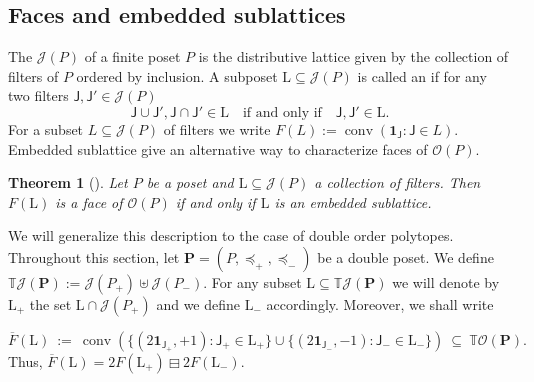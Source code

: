 \documentclass[11pt]{amsart}
\newtheorem{thm}{Theorem}[section]
\theoremstyle{definition}
\begin{document}
\subsection{Faces and embedded sublattices}\label{ssec:TO_faces}The {\textbf{\color{black}{Birkhoff lattice}}} ${{\mathcal{J}}({P})}$ of a finite poset ${P}$ is the
distributive lattice given by the collection of filters of ${P}$  ordered by
inclusion. A subposet ${\mathrm{L}} \subseteq {{\mathcal{J}}({P})}$ is called an {\textbf{\color{black}{embedded
sublattice}}} if for any two filters ${\mathsf{J}},{\mathsf{J}}' \in {{\mathcal{J}}({P})}$
\[
    {\mathsf{J}} \cup {\mathsf{J}}', {\mathsf{J}} \cap {\mathsf{J}}' \in {\mathrm{L}} \quad \text{if and
    only if} \quad {\mathsf{J}}, {\mathsf{J}}' \in {\mathrm{L}}.
\]
For a subset $L \subseteq {{\mathcal{J}}({P})}$ of filters we write $F(L) :=
\operatorname{conv}({\mathbf{1}}_{\mathsf{J}} : {\mathsf{J}} \in L)$. Embedded sublattice give an alternative
way to characterize faces of ${\mathcal{O}({P})}$.

\begin{thm}[{\cite[Thm~1.1(f)]{Wagner}}] \label{thm:O_faces}
    Let ${P}$ be a poset and ${\mathrm{L}} \subseteq {{\mathcal{J}}({P})}$ a collection of filters.
    Then $F({\mathrm{L}})$ is a face of ${\mathcal{O}({P})}$ if and only if ${\mathrm{L}}$ is an embedded
    sublattice.
\end{thm}

We will generalize this description to the case of double order polytopes.
Throughout this section, let ${\mathbf{P}} = ({P},\preceq_+,\preceq_-)$ be a double
poset. We define ${{\mathbb{T}}{{\mathcal{J}}({{\mathbf{P}}})}} := {{\mathcal{J}}({{P}_+})} \uplus {{\mathcal{J}}({{P}_-})}$. For any
subset ${\mathrm{L}} \subseteq {{\mathbb{T}}{{\mathcal{J}}({{\mathbf{P}}})}}$ we will denote by ${\mathrm{L}}_+$ the set ${\mathrm{L}} \cap
{{\mathcal{J}}({{P}_+})}$ and we define ${\mathrm{L}}_-$ accordingly. Moreover, we shall write

\begin{equation}\label{eqn:Tfaces}
    {\overline{F}({\mathrm{L}})} \ := \  \operatorname{conv} \left( \{ (2{\mathbf{1}}_{{\mathsf{J}}_+}, +1) : {\mathsf{J}}_+ \in
    {\mathrm{L}}_+ \}
    \cup \{ (2{\mathbf{1}}_{{\mathsf{J}}_-}, -1) : {\mathsf{J}}_- \in {\mathrm{L}}_- \} \right) 
    \ \subseteq \ {{\mathbb{T}}{\mathcal{O}({\mathbf{P}})}}.
\end{equation}
Thus, ${\overline{F}({\mathrm{L}})}  = {{{2F({\mathrm{L}}_+)} \boxminus {2F({\mathrm{L}}_-)}}}$.
\end{document}
